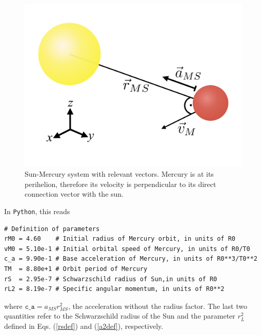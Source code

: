 \documentclass[12pt,ngerman,american]{iopart}
\newcommand{\python}[0]{\texttt{Python}}
\begin{document}
%
\begin{figure}[htb]
	\centering
	\includegraphics[width=.5\textwidth]{figs/sun_merc.pdf}
	\caption{\label{fig:sun_merc}%
		Sun-Mercury system with relevant vectors.
		Mercury is at its perihelion, therefore its velocity is perpendicular to its direct connection vector with the sun.%
	}
\end{figure}
%

In \python{}, this reads
\begin{lstlisting}
# Definition of parameters
rM0 = 4.60    # Initial radius of Mercury orbit, in units of R0
vM0 = 5.10e-1 # Initial orbital speed of Mercury, in units of R0/T0
c_a = 9.90e-1 # Base acceleration of Mercury, in units of R0**3/T0**2
TM  = 8.80e+1 # Orbit period of Mercury
rS  = 2.95e-7 # Schwarzschild radius of Sun,in units of R0
rL2 = 8.19e-7 # Specific angular momentum, in units of R0**2
\end{lstlisting}
where $\texttt{c\_a} =a_{MS} r_{MS}^2$, the acceleration without the radius factor.
The last two quantities refer to the Schwarzschild radius of the Sun and the parameter $r_L^2$ defined in Eqs. (\ref{rsdef}) and (\ref{a2def}), respectively.
\end{document}
